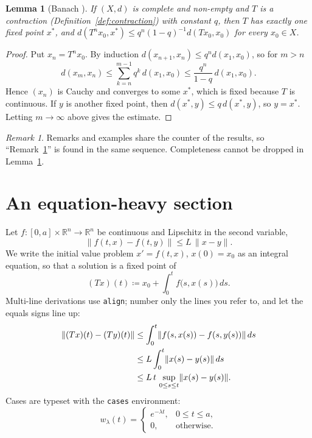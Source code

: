 \documentclass[11pt,a4paper]{amsart}
\theoremstyle{plain}   %
\newtheorem{lemma}[theorem]{Lemma}
\theoremstyle{definition}  %
\theoremstyle{remark}      %
\newtheorem{remark}[theorem]{Remark}
\numberwithin{equation}{section}  %
\newcommand{\R}{\mathbb{R}}
\newcommand{\norm}[1]{\lVert #1\rVert}
\begin{document}
\begin{lemma}[Banach \cite{banach22}]\label{lem:banach}
  If $(X,d)$ is complete and non-empty and $T$ is a contraction (Definition~\ref{def:contraction}) with constant $q$, then
  $T$ has exactly one fixed point $x^*$, and $d(T^nx_0,x^*)\le q^n(1-q)^{-1}d(Tx_0,x_0)$ for every $x_0\in X$.
\end{lemma}
\begin{proof}
  Put $x_n = T^n x_0$. By induction $d(x_{n+1},x_n)\le q^n d(x_1,x_0)$, so for $m>n$
  \[
    d(x_m,x_n)\le \sum_{k=n}^{m-1} q^k\, d(x_1,x_0)\le \frac{q^n}{1-q}\,d(x_1,x_0).
  \]
  Hence $(x_n)$ is Cauchy and converges to some $x^*$, which is fixed because $T$ is
  continuous. If $y$ is another fixed point, then $d(x^*,y)\le q\,d(x^*,y)$, so $y=x^*$.
  Letting $m\to\infty$ above gives the estimate.
\end{proof}

\begin{remark}\label{rem:completeness}
  Remarks and examples share the counter of the results, so ``Remark~\ref{rem:completeness}''
  is found in the same sequence. Completeness cannot be dropped in Lemma~\ref{lem:banach}.
\end{remark}

\section{An equation-heavy section}\label{sec:main}
Let $f\colon [0,a]\times\R^n\to\R^n$ be continuous and Lipschitz in the second variable,
\begin{equation}\label{eq:lipschitz}
  \norm{f(t,x)-f(t,y)}\le L\,\norm{x-y}.
\end{equation}
We write the initial value problem $x'=f(t,x)$, $x(0)=x_0$ as an integral equation, so
that a solution is a fixed point of
\begin{equation}\label{eq:picard}
  (Tx)(t) \coloneqq x_0 + \int_0^t f\bigl(s,x(s)\bigr)\,ds .
\end{equation}
Multi-line derivations use \texttt{align}; number only the lines you refer to, and let the
equals signs line up:
\begin{align}
  \norm{(Tx)(t)-(Ty)(t)}
    &\le \int_0^t \norm{f(s,x(s))-f(s,y(s))}\,ds \notag\\
    &\le L \int_0^t \norm{x(s)-y(s)}\,ds \label{eq:step}\\
    &\le L\,t\,\sup_{0\le s\le t}\norm{x(s)-y(s)}. \notag
\end{align}
Cases are typeset with the \texttt{cases} environment:
\begin{equation}\label{eq:weight}
  w_\lambda(t) =
  \begin{cases}
    e^{-\lambda t}, & 0\le t\le a,\\
    0, & \text{otherwise.}
  \end{cases}
\end{equation}
\end{document}
